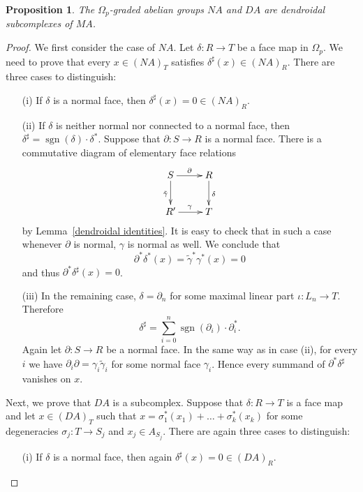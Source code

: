\documentclass[a4paper]{amsart}
\theoremstyle{plain}
\newtheorem{prop}[thm]{Proposition}
\theoremstyle{definition}
\theoremstyle{remark}
\DeclareMathOperator{\sgn}{sgn}
\newcommand{\rpd}{\Omega_p}
\newcommand{\To}{\longrightarrow}
\numberwithin{equation}{section}
\numberwithin{figure}{section}
\begin{document}
\begin{prop}
    The $\rpd$-graded abelian groups $NA$ and $DA$ are dendroidal subcomplexes of $MA$.
\end{prop}
\begin{proof}
    We first consider the case of $NA$. Let $\delta\colon R\To T$ be a face map in $\rpd$. We need to prove that
    every $x\in (NA)_T$ satisfies $\delta^\sharp(x)\in (NA)_R$. There are three cases to distinguish:
    \begin{itemize}
        \item[{\rm (i)}] If $\delta$ is a normal face, then $\delta^\sharp(x)=0\in (NA)_R$.
        \item[{\rm (ii)}] If $\delta$ is neither normal nor connected to a normal face, then
              $\delta^\sharp=\sgn(\delta)\cdot\delta^*$. Suppose that $\partial\colon S\To R$ is a normal face. There is a
              commutative diagram of elementary face relations
              \[
                  \xymatrix{S\ar[r]^-{\partial}\ar[d]_{\tilde\gamma} &R\ar[d]^\delta\\
                  R'\ar[r]^{\gamma} &T}
              \]
              by Lemma~\ref{dendroidal identities}. It is easy to check that in such a case whenever $\partial$ is normal, $\gamma$
              is normal as well. We conclude that
              \[
                  \partial^*\delta^*(x)=\tilde\gamma^*\gamma^*(x)=0
              \]
              and thus $\partial^*\delta^\sharp(x)=0$.
        \item[{\rm (iii)}] In the remaining case, $\delta=\partial_n$ for some maximal linear part $\iota\colon L_n\To T$. Therefore
              \[
                  \delta^\sharp=\sum_{i=0}^n\sgn(\partial_i)\cdot\partial_i^*.
              \]
              Again let $\partial\colon S\To R$ be a normal face. In the same way as in case (ii), for every $i$ we have
              $\partial_i\partial=\gamma_i\tilde\gamma_i$ for some normal face $\gamma_i$. Hence every summand of
              $\partial^*\delta^\sharp$ vanishes on $x$.
    \end{itemize}
    Next, we prove that $DA$ is a subcomplex. Suppose that $\delta\colon R\To T$ is a face map and let $x\in (DA)_T$ such that
    $x=\sigma_1^*(x_1) +\ldots+\sigma_k^*(x_k)$ for some degeneracies $\sigma_j\colon T\To S_j$ and $x_j\in A_{S_j}$. There are
    again three cases to distinguish:
    \begin{itemize}
        \item[{\rm (i)}] If $\delta$ is a normal face, then again $\delta^\sharp(x)=0\in (DA)_R$.

\end{itemize}
\end{proof}
\end{document}
